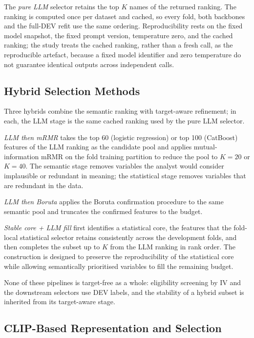 \documentclass[preprint,12pt]{elsarticle}
\newcommand{\Kfeat}{K}
\begin{document}
The \emph{pure LLM} selector retains the top $\Kfeat$ names of the returned ranking. The ranking is computed once per dataset and cached, so every fold, both backbones and the full-DEV refit use the same ordering. Reproducibility rests on the fixed model snapshot, the fixed prompt version, temperature zero, and the cached ranking; the study treats the cached ranking, rather than a fresh call, as the reproducible artefact, because a fixed model identifier and zero temperature do not guarantee identical outputs across independent calls.

\subsection{Hybrid Selection Methods}
\label{subsec:hybrid_fs}

Three hybrids combine the semantic ranking with target-aware refinement; in each, the LLM stage is the same cached ranking used by the pure LLM selector.

\emph{LLM then mRMR} takes the top 60 (logistic regression) or top 100 (CatBoost) features of the LLM ranking as the candidate pool and applies mutual-information mRMR on the fold training partition to reduce the pool to $\Kfeat=20$ or $\Kfeat=40$. The semantic stage removes variables the analyst would consider implausible or redundant in meaning; the statistical stage removes variables that are redundant in the data.

\emph{LLM then Boruta} applies the Boruta confirmation procedure to the same semantic pool and truncates the confirmed features to the budget.

\emph{Stable core + LLM fill} first identifies a statistical core, the features that the fold-local statistical selector retains consistently across the development folds, and then completes the subset up to $\Kfeat$ from the LLM ranking in rank order. The construction is designed to preserve the reproducibility of the statistical core while allowing semantically prioritised variables to fill the remaining budget.

None of these pipelines is target-free as a whole: eligibility screening by IV and the downstream selectors use DEV labels, and the stability of a hybrid subset is inherited from its target-aware stage.

\subsection{CLIP-Based Representation and Selection}
\label{subsec:clip_fs}
\end{document}
